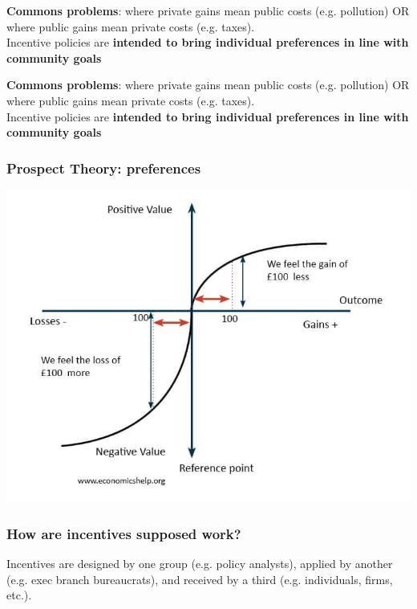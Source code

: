 \documentclass[aspectratio=169]{beamer}
\theoremstyle{principle}
\begin{document}
\begin{frame}
\begin{center}
\Large \textbf{Commons problems}: where private gains mean public costs (e.g. pollution) OR where public gains mean private costs (e.g. taxes).\\
\bigskip
\bigskip
\color{white}Incentive policies are \textbf{intended to bring individual preferences in line with community goals} 
\end{center}
\end{frame}

\begin{frame}
\begin{center}
\Large \textbf{Commons problems}: where private gains mean public costs (e.g. pollution) OR where public gains mean private costs (e.g. taxes).\\
\bigskip
\bigskip
Incentive policies are \textbf{intended to bring individual preferences in line with community goals} 
\end{center}
\end{frame}

\begin{frame}
\frametitle{Prospect Theory: preferences}
\begin{center}
\includegraphics[scale=0.35]{prospect-theory.jpg}
\end{center}
\end{frame}

\begin{frame}
\frametitle{How are incentives supposed work?}
\begin{center}
\Large Incentives are designed by one group (e.g. policy analysts), applied by another (e.g. exec branch bureaucrats), and received by a third (e.g. individuals, firms, etc.).
\end{center}
\end{frame}
\end{document}
